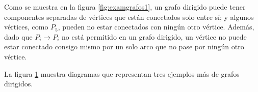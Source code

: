 Como se muestra en la figura \ref{fig:examgrafos1}, un grafo dirigido puede tener componentes separadas de vértices que están conectados solo entre sí; y algunos vértices, como $P_5$, pueden no estar conectados con ningún otro vértice. Además, dado que $P_i \rightarrow P_i$ no está permitido en un grafo dirigido, un vértice no puede estar conectado consigo mismo por un solo arco que no pase por ningún otro vértice.

La figura \ref{fig:examgrafos2} muestra diagramas que representan tres ejemplos más de grafos dirigidos.
\begin{figure}[h!]
    \centering
     \hfill
     \hfill
    \caption{~}
    \label{fig:examgrafos2}
\end{figure}

